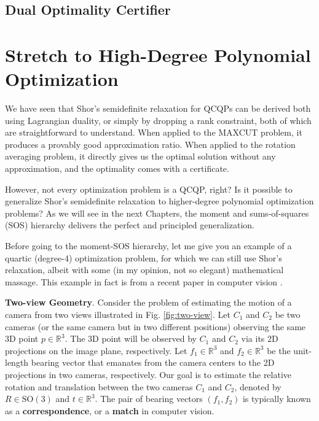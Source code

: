 \documentclass[
]{book}
\theoremstyle{definition}
\theoremstyle{definition}
\theoremstyle{definition}
\theoremstyle{definition}
\theoremstyle{remark}
\begin{document}
\subsection{Dual Optimality Certifier}\label{dual-optimality-certifier}

\section{Stretch to High-Degree Polynomial Optimization}\label{stretch-to-high-degree-polynomial-optimization}

We have seen that Shor's semidefinite relaxation for QCQPs can be derived both using Lagrangian duality, or simply by dropping a rank constraint, both of which are straightforward to understand. When applied to the MAXCUT problem, it produces a provably good approximation ratio. When applied to the rotation averaging problem, it directly gives us the optimal solution without any approximation, and the optimality comes with a certificate.

However, not every optimization problem is a QCQP, right? Is it possible to generalize Shor's semidefinite relaxation to higher-degree polynomial optimization problems? As we will see in the next Chapters, the moment and sums-of-squares (SOS) hierarchy delivers the perfect and principled generalization.

Before going to the moment-SOS hierarchy, let me give you an example of a quartic (degree-4) optimization problem, for which we can still use Shor's relaxation, albeit with some (in my opinion, not so elegant) mathematical massage. This example in fact is from a recent paper in computer vision \citep{briales18cvpr-certifiably}.

\textbf{Two-view Geometry}. Consider the problem of estimating the motion of a camera from two views illustrated in Fig. \ref{fig:two-view}. Let \(C_1\) and \(C_2\) be two cameras (or the same camera but in two different positions) observing the same 3D point \(p \in \mathbb{R}^{3}\). The 3D point will be observed by \(C_1\) and \(C_2\) via its 2D projections on the image plane, respectively. Let \(f_1 \in \mathbb{R}^{3}\) and \(f_2 \in \mathbb{R}^{3}\) be the unit-length bearing vector that emanates from the camera centers to the 2D projections in two cameras, respectively. Our goal is to estimate the relative rotation and translation between the two cameras \(C_1\) and \(C_2\), denoted by \(R \in \mathrm{SO}(3)\) and \(t \in \mathbb{R}^{3}\). The pair of bearing vectors \((f_1,f_2)\) is typically known as a \textbf{correspondence}, or a \textbf{match} in computer vision.
\end{document}
